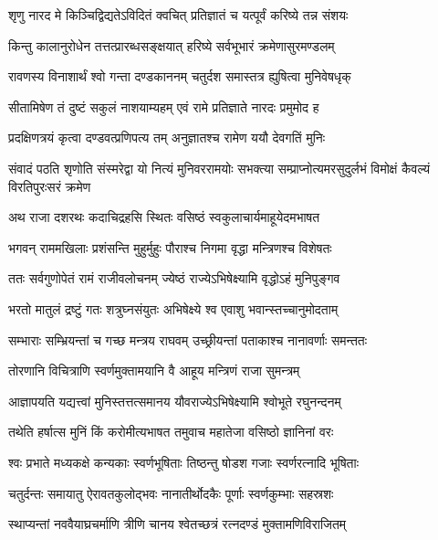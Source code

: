 \twolineshloka
{शृणु नारद मे किञ्चिद्विद्यतेऽविदितं क्वचित्}
{प्रतिज्ञातं च यत्पूर्वं करिष्ये तन्न संशयः} %

\twolineshloka
{किन्तु कालानुरोधेन तत्तत्प्रारब्धसङ्क्षयात्}
{हरिष्ये सर्वभूभारं क्रमेणासुरमण्डलम्} %

\twolineshloka
{रावणस्य विनाशार्थं श्वो गन्ता दण्डकाननम्}
{चतुर्दश समास्तत्र ह्युषित्वा मुनिवेषधृक्} %

\twolineshloka
{सीतामिषेण तं दुष्टं सकुलं नाशयाम्यहम्}
{एवं रामे प्रतिज्ञाते नारदः प्रमुमोद ह} %

\twolineshloka
{प्रदक्षिणत्रयं कृत्वा दण्डवत्प्रणिपत्य तम्}
{अनुज्ञातश्च रामेण ययौ देवगतिं मुनिः} %

\fourlineindentedshloka
{संवादं पठति शृणोति संस्मरेद्वा}
{यो नित्यं मुनिवररामयोः सभक्त्या}
{सम्प्राप्नोत्यमरसुदुर्लभं विमोक्षं}
{कैवल्यं विरतिपुरःसरं क्रमेण} %





\twolineshloka
{अथ राजा दशरथः कदाचिद्रहसि स्थितः}
{वसिष्ठं स्वकुलाचार्यमाहूयेदमभाषत} %

\twolineshloka
{भगवन् राममखिलाः प्रशंसन्ति मुहुर्मुहुः}
{पौराश्च निगमा वृद्धा मन्त्रिणश्च विशेषतः} %

\twolineshloka
{ततः सर्वगुणोपेतं रामं राजीवलोचनम्}
{ज्येष्ठं राज्येऽभिषेक्ष्यामि वृद्धोऽहं मुनिपुङ्गव} %

\twolineshloka
{भरतो मातुलं द्रष्टुं गतः शत्रुघ्नसंयुतः}
{अभिषेक्ष्ये श्व एवाशु भवान्स्तच्चानुमोदताम्} %

\twolineshloka
{सम्भाराः सम्भ्रियन्तां च गच्छ मन्त्रय राघवम्}
{उच्छ्रीयन्तां पताकाश्च नानावर्णाः समन्ततः} %

\twolineshloka
{तोरणानि विचित्राणि स्वर्णमुक्तामयानि वै}
{आहूय मन्त्रिणं राजा सुमन्त्रम्} %

\twolineshloka
{आज्ञापयति यद्यत्त्वां मुनिस्तत्तत्समानय}
{यौवराज्येऽभिषेक्ष्यामि श्वोभूते रघुनन्दनम्} %

\twolineshloka
{तथेति हर्षात्स मुनिं किं करोमीत्यभाषत}
{तमुवाच महातेजा वसिष्ठो ज्ञानिनां वरः} %

\twolineshloka
{श्वः प्रभाते मध्यकक्षे कन्यकाः स्वर्णभूषिताः}
{तिष्ठन्तु षोडश गजाः स्वर्णरत्नादि भूषिताः} %

\twolineshloka
{चतुर्दन्तः समायातु ऐरावतकुलोद्भवः}
{नानातीर्थोदकैः पूर्णाः स्वर्णकुम्भाः सहस्रशः} %

\twolineshloka
{स्थाप्यन्तां नववैयाघ्रचर्माणि त्रीणि चानय}
{श्वेतच्छत्रं रत्नदण्डं मुक्तामणिविराजितम्} %

